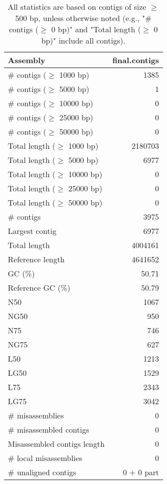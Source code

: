 \documentclass[12pt,a4paper]{article}
\begin{document}
\begin{table}[ht]
\begin{center}
\caption{All statistics are based on contigs of size $\geq$ 500 bp, unless otherwise noted (e.g., "\# contigs ($\geq$ 0 bp)" and "Total length ($\geq$ 0 bp)" include all contigs).}
\begin{tabular}{|l*{1}{|r}|}
\hline
Assembly & final.contigs \\ \hline
\# contigs ($\geq$ 1000 bp) & 1385 \\ \hline
\# contigs ($\geq$ 5000 bp) & 1 \\ \hline
\# contigs ($\geq$ 10000 bp) & 0 \\ \hline
\# contigs ($\geq$ 25000 bp) & 0 \\ \hline
\# contigs ($\geq$ 50000 bp) & 0 \\ \hline
Total length ($\geq$ 1000 bp) & 2180703 \\ \hline
Total length ($\geq$ 5000 bp) & 6977 \\ \hline
Total length ($\geq$ 10000 bp) & 0 \\ \hline
Total length ($\geq$ 25000 bp) & 0 \\ \hline
Total length ($\geq$ 50000 bp) & 0 \\ \hline
\# contigs & 3975 \\ \hline
Largest contig & 6977 \\ \hline
Total length & 4004161 \\ \hline
Reference length & 4641652 \\ \hline
GC (\%) & 50.71 \\ \hline
Reference GC (\%) & 50.79 \\ \hline
N50 & 1067 \\ \hline
NG50 & 950 \\ \hline
N75 & 746 \\ \hline
NG75 & 627 \\ \hline
L50 & 1213 \\ \hline
LG50 & 1529 \\ \hline
L75 & 2343 \\ \hline
LG75 & 3042 \\ \hline
\# misassemblies & 0 \\ \hline
\# misassembled contigs & 0 \\ \hline
Misassembled contigs length & 0 \\ \hline
\# local misassemblies & 0 \\ \hline
\# unaligned contigs & 0 + 0 part \\ \hline

\end{tabular}
\end{center}
\end{table}
\end{document}
